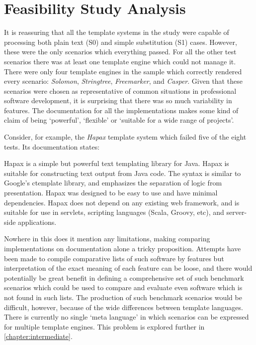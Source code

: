 \section{Feasibility Study Analysis}
\label{fs1:analysis}

It is reassuring that all the template systems in the study were capable of processing both plain text (S0) and simple substitution (S1) cases. However, these were the only scenarios which everything passed. For all the other test scenarios there was at least one template engine which could not manage it. There were only four template engines in the sample which correctly rendered every scenario: \emph{Solomon}, \emph{Stringtree}, \emph{Freemarker}, and \emph{Casper}. Given that these scenarios were chosen as representative of common situations in professional software development, it is surprising that there was so much variability in features. The documentation for all the implementations makes some kind of claim of being `powerful', `flexible' or `suitable for a wide range of projects'. 

Consider, for example, the \emph{Hapax} template system which failed five of the eight tests. Its documentation states:

\begin{displayquote}
Hapax is a simple but powerful text templating library for Java. Hapax is suitable for constructing text output from Java code. The syntax is similar to Google's ctemplate library, and emphasizes the separation of logic from presentation. Hapax was designed to be easy to use and have minimal dependencies. Hapax does not depend on any existing web framework, and is suitable for use in servlets, scripting languages (Scala, Groovy, etc), and server-side applications.
\end{displayquote}

Nowhere in this does it mention any limitations, making comparing implementations on documentation alone a tricky proposition. Attempts have been made to compile comparative lists of such software by features \citep{Wikipedia2018} but interpretation of the exact meaning of each feature can be loose, and there would potentially be great benefit in defining a comprehensive set of such benchmark scenarios which could be used to compare and evaluate even software which is not found in such lists. The production of such benchmark scenarios would be difficult, however, because of the wide differences between template languages. There is currently no single `meta language' in which scenarios can be expressed for multiple template engines. This problem is explored further in \autoref{chapter:intermediate}.

